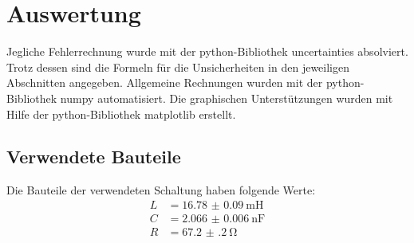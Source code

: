 \section{Auswertung}
\label{sec:Auswertung}
Jegliche Fehlerrechnung wurde mit der python-Bibliothek uncertainties \cite{uncertainties} absolviert.
Trotz dessen sind die Formeln für die Unsicherheiten in den jeweiligen Abschnitten angegeben.
Allgemeine Rechnungen wurden mit der python-Bibliothek numpy \cite{numpy} automatisiert. 
Die graphischen Unterstützungen wurden mit Hilfe der python-Bibliothek matplotlib \cite{matplotlib} erstellt.\\
\subsection{Verwendete Bauteile} \label{subsec:bauteile}
Die Bauteile der verwendeten Schaltung haben folgende Werte:
\begin{align*}
    L   & = \SI{16.78(9)} {\milli\henry}\\
    C   & = \SI{2.066(6)} {\nano\farad} \\
    R   & = \SI{67.2(2)}  {\ohm}
\end{align*}

